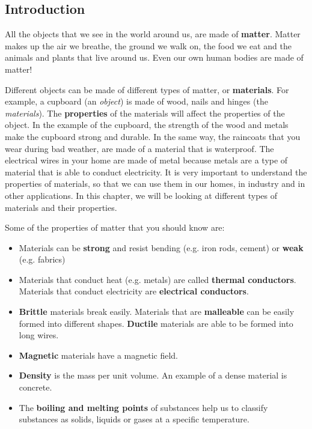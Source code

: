             \subsection{ Introduction}
            \nopagebreak
            \label{m38708*id62175}All the objects that we see in the world around us, are made of \textbf{matter}. Matter makes up the air we breathe, the ground we walk on, the food we eat and the animals and plants that live around us. Even our own human bodies are made of matter!\par 
      \label{m38708*id62185}Different objects can be made of different types of matter, or \textbf{materials}. For example, a cupboard (an \textsl{object}) is made of wood, nails and hinges (the \textsl{materials}). The \textbf{properties} of the materials will affect the properties of the object. In the example of the cupboard, the strength of the wood and metals make the cupboard strong and durable. In the same way, the raincoats that you wear during bad weather, are made of a material that is waterproof. The electrical wires in your home are made of metal because metals are a type of material that is able to conduct electricity. It is very important to understand the properties of materials, so that we can use them in our homes, in industry and in other applications. In this chapter, we will be looking at different types of materials and their properties.\par 
\label{m38708*id0132}Some of the properties of matter that you should know are:
\label{m38708*lid825}\begin{itemize}[noitemsep]
  \item Materials can be \textbf{strong} and resist bending (e.g. iron rods, cement) or \textbf{weak} (e.g. fabrics)
  \item Materials that conduct heat (e.g. metals) are called \textbf{thermal conductors}. Materials that conduct electricity are \textbf{electrical conductors}.
  \item \textbf{Brittle} materials break easily. Materials that are \textbf{malleable} can be easily formed into different shapes. \textbf{Ductile} materials are able to be formed into long wires.
  \item \textbf{Magnetic} materials have a magnetic field.
  \item \textbf{Density} is the mass per unit volume. An example of a dense material is concrete.
  \item The \textbf{boiling and melting points} of substances help us to classify substances as solids, liquids or gases at a specific temperature.\end{itemize}
